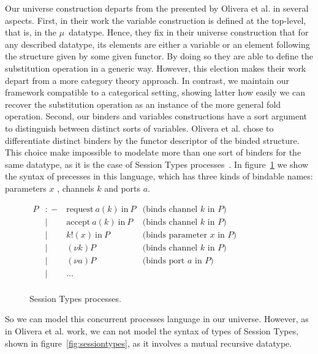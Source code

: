 \documentclass{book}
\begin{document}

Our universe construction departs from the presented by Olivera et al. in several aspects. First, in their work the variable construction is defined at the top-level, that is, in the $\mu$\ datatype. Hence, they fix in their universe construction that for any described datatype, its elements are either a variable or an element following the structure given by some given functor. By doing so they are able to define the substitution operation in a generic way. However, this election makes their work depart from a more category theory approach. In contrast, we maintain our framework compatible to a categorical setting, showing latter how easily we can recover the substitution operation as an instance of the more general fold operation. Second, our binders and variables constructions have a sort argument to distinguish between distinct sorts of variables. Olivera et al. chose to differentiate distinct binders by the functor descriptor of the binded structure. This choice make impossible to modelate more than one sort of binders for the same datatype, as it is the case of Session Types processes~\cite{YOSHIDA200773}. In figure~\ref{fig:sessiontypesproc} we show the syntax of precesses in this language, which has three kinds of bindable names: parameters $x$ , channels $k$ and ports $a$.

\begin{figure}[h]\centering 
      $\begin{array}{lcll}
        P &{:\!\!-}& \text{request}\ a(k)\ \text{in}\ P  & \text{(binds channel $k$\ in $P$)} \\
        &|&  \text{accept}\ a(k)\ \text{in}\ P  & \text{(binds channel $k$\ in $P$)} \\
        &|& k!(x)\ \text{in}\ P & \text{(binds parameter $x$\ in $P$)} \\
        &|& (\nu k) P & \text{(binds channel $k$\ in $P$)} \\
        &|& (\nu a) P & \text{(binds port $a$\ in $P$)} \\
        &|& \dots & \\
      \end{array}$
\caption{Session Types processes.}
\label{fig:sessiontypesproc}
\end{figure}

So we can model this concurrent processes language in our universe. However, as in Olivera et al. work, we can not model the syntax of types of Session Types, shown in figure~\ref{fig:sessiontypes}, as it involves a mutual recursive datatype.
\end{document}
